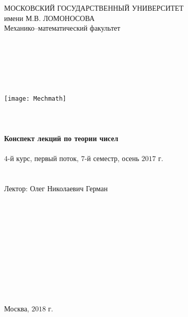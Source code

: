\begin{center}~\\~\\~\\~\\~\\
	{\large МОСКОВСКИЙ ГОСУДАРСТВЕННЫЙ УНИВЕРСИТЕТ}\\
	{\large имени М.В. ЛОМОНОСОВА}\\
	{\large Механико--математический факультет}\\
	~\\~\\~\\~\\~\\~\\
	\texttt{[image: Mechmath]}
	~\\~\\~\\~\\
	{\LARGE \bf Конспект лекций по теории чисел}
	~\\~\\
	{\large $4$-й курс, первый поток, $7$-й семестр, осень $2017$ г.}
	~\\~\\~\\
	{\large Лектор: Олег Николаевич Герман}
	~\\~\\~\\~\\~\\~\\~\\~\\~\\~\\~\\~\\
	Москва, $2018$ г.
\end{center}